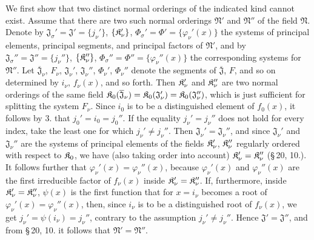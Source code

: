 We first show that two distinct normal orderings of the indicated kind cannot exist. Assume that there are two such normal orderings $\mathfrak N'$ and $\mathfrak N''$ of the field $\mathfrak N$. Denote by $\mathfrak J_\sigma'=\mathfrak J'=\{j_\nu'\}$, $\{\mathfrak K_\nu'\}$, $\Phi_\sigma'=\Phi'=\{\varphi_\nu'(x)\}$ the systems of principal elements, principal segments, and principal factors of $\mathfrak N'$, and by $\mathfrak J_\sigma''=\mathfrak J''=\{j_\nu''\}$, $\{\mathfrak K_\nu''\}$, $\Phi_\sigma''=\Phi''=\{\varphi_\nu''(x)\}$ the corresponding systems for $\mathfrak N''$. Let $\overline{\mathfrak J}_\nu$, $F_\nu$, $\mathfrak J_\nu'$, $\mathfrak J_\nu''$, $\Phi_\nu'$, $\Phi_\nu''$ denote the segments of $\overline{\mathfrak J}$, $F$, and so on determined by $i_\nu$, $f_\nu(x)$, and so forth. Then $\mathfrak K_\nu'$ and $\mathfrak K_\nu''$ are two normal orderings of the same field $\mathfrak K_0(\overline{\mathfrak J}_\nu)=\mathfrak K_0(\mathfrak J_\nu')=\mathfrak K_0(\mathfrak J_\nu'')$, which is just sufficient for splitting the system $F_\nu$. Since $i_0$ is to be a distinguished element of $f_0(x)$, it follows by 3. that $j_0'=i_0=j_0''$. If the equality $j_\nu'=j_\nu''$ does not hold for every index, take the least one for which $j_\nu'\neq j_\nu''$. Then $\mathfrak J_\nu'=\mathfrak J_\nu''$, and since $\mathfrak J_\nu'$ and $\mathfrak J_\nu''$ are the systems of principal elements of the fields $\mathfrak K_\nu'$, $\mathfrak K_\nu''$ regularly ordered with respect to $\mathfrak K_0$, we have (also taking order into account) $\mathfrak K_\nu'=\mathfrak K_\nu''$ (\S\,20, 10.). It follows further that $\varphi_\nu'(x)=\varphi_\nu''(x)$, because $\varphi_\nu'(x)$ and $\varphi_\nu''(x)$ are the first irreducible factor of $f_\nu(x)$ inside $\mathfrak K_\nu'=\mathfrak K_\nu''$. If, furthermore, inside $\mathfrak K_\nu'=\mathfrak K_\nu''$, $\psi(x)$ is the first function that for $x=i_\nu$ becomes a root of $\varphi_\nu'(x)=\varphi_\nu''(x)$, then, since $i_\nu$ is to be a distinguished root of $f_\nu(x)$, we get $j_\nu'=\psi(i_\nu)=j_\nu''$, contrary to the assumption $j_\nu'\neq j_\nu''$. Hence $\mathfrak J'=\mathfrak J''$, and from \S\,20, 10. it follows that $\mathfrak N'=\mathfrak N''$.

